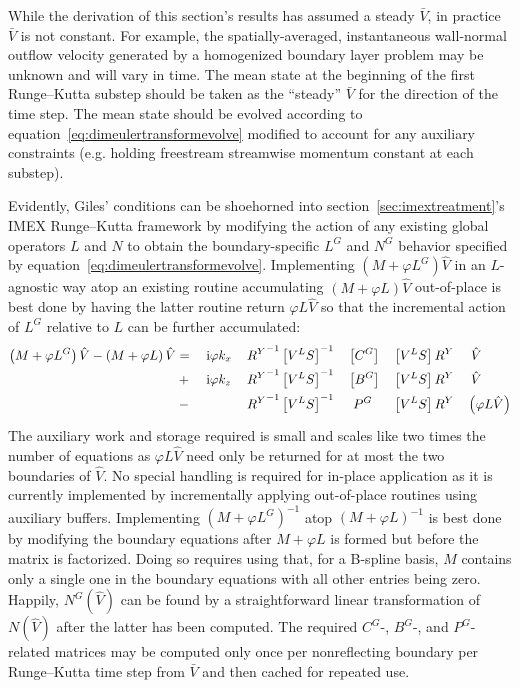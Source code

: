 While the derivation of this section's results has assumed a steady $\bar{V}$,
in practice $\bar{V}$ is not constant.  For example, the spatially-averaged,
instantaneous wall-normal outflow velocity generated by a homogenized boundary
layer problem may be unknown and will vary in time.  The mean state at the
beginning of the first Runge--Kutta substep should be taken as the ``steady''
$\bar{V}$ for the direction of the time step.  The mean state should be evolved
according to equation~\eqref{eq:dimeulertransformevolve} modified to account
for any auxiliary constraints (e.g. holding freestream streamwise momentum
constant at each substep).

Evidently, Giles' conditions can be shoehorned into
section~\ref{sec:imextreatment}'s IMEX Runge--Kutta framework by modifying the
action of any existing global operators $L$ and $N$ to obtain the
boundary-specific $L^G$ and $N^G$ behavior specified by
equation~\eqref{eq:dimeulertransformevolve}.  Implementing
$\left(M+\varphi{}L^G\right)\hat{V}$ in an $L$-agnostic way atop an existing
routine accumulating $\left(M+\varphi{}L\right)\hat{V}$ out-of-place is best
done by having the latter routine return $\varphi{}L\hat{V}$ so that the
incremental action of $L^G$ relative to $L$ can be further accumulated:
\begin{alignat}{10}
\left(M+\varphi{}L^G\right)\hat{V} - \left(M+\varphi{}L\right)\hat{V}
  &={}   &&\ii \varphi{} k_x \, &&{R^Y}^{-1} \left[V^L S\right]^{-1} &&\left[C^G\right]                    &&\left[V^L S\right] {R^Y} &&\,\,\hat{V} \\
  &{}+{} &&\ii \varphi{} k_z    &&{R^Y}^{-1} \left[V^L S\right]^{-1} &&\left[B^G\right]                    &&\left[V^L S\right] {R^Y} &&\,\,\hat{V} \\
  &{}-{} &&                     &&{R^Y}^{-1} \left[V^L S\right]^{-1} &&\phantom{\Bigl[}P^G\phantom{\Bigr]} &&\left[V^L S\right] {R^Y} &&\left(\varphi{}L\hat{V}\right)
\end{alignat}
The auxiliary work and storage required is small and scales like two times the
number of equations as $\varphi{}L\hat{V}$ need only be returned for at most
the two boundaries of $\hat{V}$.  No special handling is required for in-place
application as it is currently implemented by incrementally applying
out-of-place routines using auxiliary buffers.  Implementing
$\left(M+\varphi{}L^G\right)^{-1}$ atop $\left(M+\varphi{}L\right)^{-1}$ is
best done by modifying the boundary equations after $M+\varphi{}L$ is formed
but before the matrix is factorized.  Doing so requires using that, for a
B-spline basis, $M$ contains only a single one in the boundary equations with
all other entries being zero.  Happily, $N^G(\hat{V})$ can be found by a
straightforward linear transformation of $N(\hat{V})$ after the latter has been
computed.  The required $C^G$-, $B^G$-, and $P^G$-related matrices may be
computed only once per nonreflecting boundary per Runge--Kutta time step from
$\bar{V}$ and then cached for repeated use.

